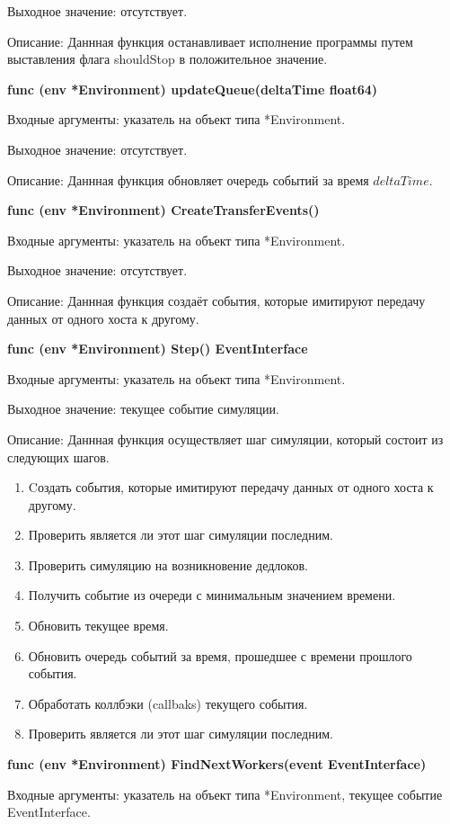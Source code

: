Выходное значение: отсутствует.

Описание: Даннная функция останавливает исполнение программы путем выставления флага shouldStop в положительное значение.

\textbf{func (env *Environment) updateQueue(deltaTime float64) }

Входные аргументы: указатель на объект типа *Environment.

Выходное значение: отсутствует.

Описание: Даннная функция обновляет очередь событий за время $deltaTime$. 

\textbf{func (env *Environment) CreateTransferEvents()}

Входные аргументы: указатель на объект типа *Environment.

Выходное значение: отсутствует.

Описание: Даннная функция создаёт события, которые имитируют передачу данных от одного хоста к другому.

\textbf{func (env *Environment) Step() EventInterface }

Входные аргументы: указатель на объект типа *Environment.

Выходное значение: текущее событие симуляции.

Описание: Даннная функция осуществляет шаг симуляции, который состоит из следующих шагов. 
\begin{enumerate}
\item Cоздать события, которые имитируют передачу данных от одного хоста к другому.
\item Проверить является ли этот шаг симуляции последним.
\item Проверить симуляцию на возникновение дедлоков.
\item Получить событие из очереди с минимальным значением времени.
\item Обновить текущее время.
\item Обновить очередь событий за время, прошедшее с времени прошлого события.
\item Обработать коллбэки (callbaks) текущего события.
\item Проверить является ли этот шаг симуляции последним.

\end{enumerate}

\textbf{func (env *Environment) FindNextWorkers(event EventInterface)}

Входные аргументы: указатель на объект типа *Environment, текущее событие EventInterface.

